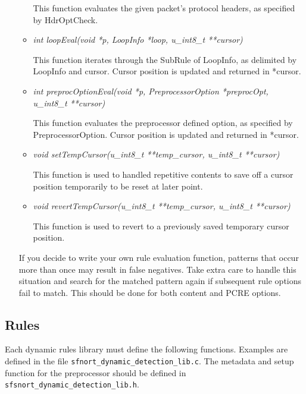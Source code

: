 \documentclass[english]{report}
\newenvironment{note}{
\samepage
    \vspace{10pt}{\textsf{
        {\hspace{7pt}\Huge{$\triangle$\hspace{-12.5pt}{\Large{$^!$}}}}\hspace{5pt}
        {\Large{NOTE}}
    }
    }
   \begin{center}
    \par\vspace{-17pt}

    \begin{lrbox}{\savepar}
    \begin{minipage}[r]{6in}
}
{
    \end{minipage}
    \end{lrbox}
    \fbox{
        \usebox{
            \savepar
	}
    }
    \par\vskip10pt
    \end{center}
}
\newenvironment{note}{
        \begin{rawhtml}
        <p><table border="1"><tr><td><b>
        Note:&nbsp;&nbsp;</b>
        \end{rawhtml}
}{
        \begin{rawhtml}
        </b></td></tr></table></p>
        \end{rawhtml}
}
\begin{document}
\begin{itemize}
\begin{itemize}
This function evaluates the given packet's protocol headers, as specified by
HdrOptCheck.

\item {\em int loopEval(void *p, LoopInfo *loop, u\_int8\_t **cursor)}

This function iterates through the SubRule of LoopInfo, as delimited by
LoopInfo and cursor.  Cursor position is updated and returned in *cursor.

\item {\em int preprocOptionEval(void *p, PreprocessorOption *preprocOpt, u\_int8\_t **cursor)}

This function evaluates the preprocessor defined option, as specified by
PreprocessorOption.  Cursor position is updated and returned in *cursor.

\item {\em void setTempCursor(u\_int8\_t **temp\_cursor, u\_int8\_t **cursor)}

This function is used to handled repetitive contents to save off a cursor
position temporarily to be reset at later point.

\item {\em void revertTempCursor(u\_int8\_t **temp\_cursor, u\_int8\_t **cursor)}

This function is used to revert to a previously saved temporary cursor
position.

\end{itemize}

\begin{note}

If you decide to write your own rule evaluation function, patterns that occur
more than once may result in false negatives.  Take extra care to handle this
situation and search for the matched pattern again if subsequent rule options
fail to match.  This should be done for both content and PCRE options.

\end{note}
\end{itemize}

\subsection{Rules}

Each dynamic rules library must define the following functions.  Examples are
defined in the file \texttt{sfnort\_dynamic\_detection\_lib.c}.  The metadata
and setup function for the preprocessor should be defined in
\texttt{sfsnort\_dynamic\_detection\_lib.h}.
\end{document}
